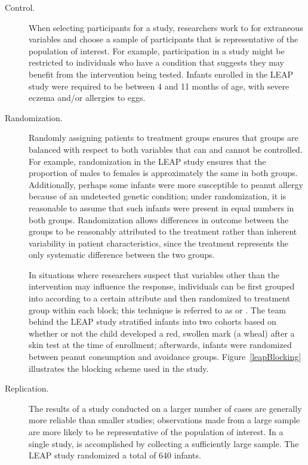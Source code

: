 \begin{description}

	\item[Control.] When selecting participants for a study, researchers work to  for extraneous variables and choose a sample of participants that is representative of the population of interest. For example, participation in a study might be restricted to individuals who have a condition that suggests they may benefit from the intervention being tested. Infants enrolled in the LEAP study were required to be between 4 and 11 months of age, with severe eczema and/or allergies to eggs.

	\item[Randomization.] Randomly assigning patients to treatment groups ensures that groups are balanced with respect to both variables that can and cannot be controlled. For example, randomization in the LEAP study ensures that the proportion of males to females is approximately the same in both groups. Additionally, perhaps some infants were more susceptible to peanut allergy because of an undetected genetic condition; under randomization, it is reasonable to assume that such infants were present in equal numbers in both groups. Randomization allows differences in outcome between the groups to be reasonably attributed to the treatment rather than inherent variability in patient characteristics, since the treatment represents the only systematic difference between the two groups. 
	
	In situations where researchers suspect that variables other than the intervention may influence the response, individuals can be first grouped into  according to a certain attribute and then randomized to treatment group within each block; this technique is referred to as  or . The team behind the LEAP study stratified infants into two cohorts based on whether or not the child developed a red, swollen mark (a wheal) after a skin test at the time of enrollment; afterwards, infants were randomized between peanut consumption and avoidance groups. Figure~\ref{leapBlocking} illustrates the blocking scheme used in the study. 

	\item[Replication.] The results of a study conducted on a larger number of cases are generally more reliable than smaller studies; observations made from a large sample are more likely to be representative of the population of interest. In a single study,  is accomplished by collecting a sufficiently large sample. The LEAP study randomized a total of 640 infants.

\end{description}

